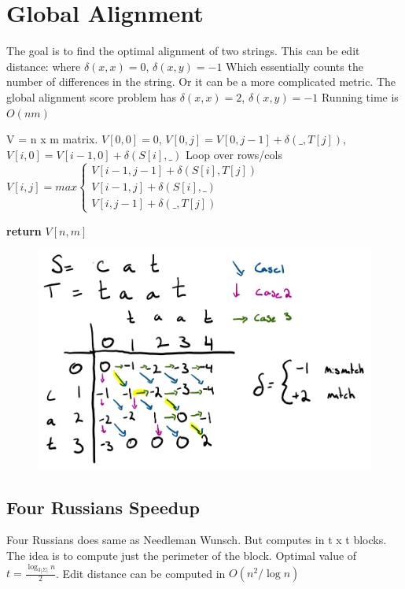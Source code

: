 \documentclass[10pt]{article}
\begin{document}
\section{Global Alignment}
The goal is to find the optimal alignment of two strings.
This can be edit distance: where $\delta(x, x) = 0$, $\delta(x, y) = -1$
Which essentially counts the number of differences in the string. Or it can be a more complicated metric.
The global alignment score problem has $\delta(x, x) = 2$, $\delta(x,y) = -1$
Running time is $O(nm)$
\begin{algorithm}[H]
    \begin{algorithmic}[1]
    \tiny
        \State V = n x m matrix.
        \State $V[0,0] = 0$, $V[0,j] = V[0,j-1] + \delta(\_, T[j])$, $V[i,0] = V[i-1,0] + \delta(S[i], \_)$
        \State Loop over rows/cols
        \State $V[i,j] = max \begin{cases}
            V[i-1, j-1] + \delta(S[i], T[j]) \\
            V[i-1, j] + \delta(S[i], \_) \\
            V[i, j-1] + \delta(\_, T[j])
        \end{cases}$

    \State \textbf{return} $V[n, m]$
    \EndFunction
    \end{algorithmic}
\end{algorithm}

\begin{figure}[H] 
    \centering
    \includegraphics[width=0.7 \linewidth]{global_alignment.png}
    \label{fig:}
\end{figure}

\subsection{Four Russians Speedup}
Four Russians does same as Needleman Wunsch. But computes in t x t blocks.
The idea is to compute just the perimeter of the block. 
Optimal value of $t = \frac{\log_{3 |\Sigma|}n}{2}$.
Edit distance can be computed in $O(n^2 / \log n)$
\end{document}
